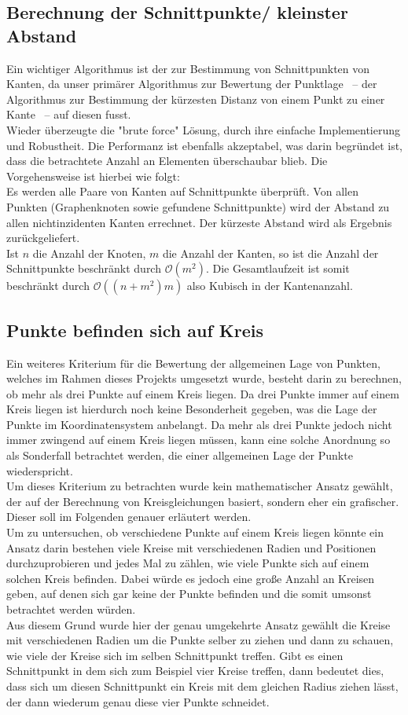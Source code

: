\documentclass[a4paper,twocolumn]{scrartcl}
\begin{document}
\subsection{Berechnung der Schnittpunkte/ kleinster Abstand}
Ein wichtiger Algorithmus ist der zur Bestimmung von Schnittpunkten von Kanten, da unser primärer Algorithmus zur Bewertung der Punktlage ~-- der Algorithmus zur Bestimmung der kürzesten Distanz von einem Punkt zu einer Kante ~-- auf diesen fusst. \\
Wieder \"uberzeugte die "brute force" L\"osung, durch ihre einfache Implementierung und Robustheit. Die Performanz ist ebenfalls akzeptabel, was darin begr\"undet ist, dass die betrachtete Anzahl an Elementen \"uberschaubar blieb.
Die Vorgehensweise  ist hierbei wie folgt:\\
Es werden alle Paare von Kanten auf Schnittpunkte \"uberpr\"uft. Von allen Punkten (Graphenknoten sowie  gefundene Schnittpunkte) wird der Abstand zu allen nichtinzidenten Kanten errechnet. Der k\"urzeste Abstand wird als Ergebnis zur\"uckgeliefert.\\
Ist $n$ die Anzahl der Knoten, $m$ die Anzahl der Kanten, so ist die Anzahl der Schnittpunkte beschr\"ankt durch $\mathcal{O}(m^2)$. Die Gesamtlaufzeit ist somit beschr\"ankt durch $\mathcal{O}((n+m^2)m)$ also Kubisch in der Kantenanzahl.
\subsection{Punkte befinden sich auf Kreis}
Ein weiteres Kriterium für die Bewertung der allgemeinen Lage von Punkten, welches im Rahmen dieses Projekts umgesetzt wurde, besteht darin zu berechnen, ob mehr als drei Punkte auf einem Kreis liegen. Da drei Punkte immer auf einem Kreis liegen ist hierdurch noch keine Besonderheit gegeben, was die Lage der Punkte im Koordinatensystem anbelangt. Da mehr als drei Punkte jedoch nicht immer zwingend auf einem Kreis liegen müssen, kann eine solche Anordnung so als Sonderfall betrachtet werden, die einer allgemeinen Lage der Punkte wiederspricht.\\
Um dieses Kriterium zu betrachten wurde kein mathematischer Ansatz gewählt, der auf der Berechnung von Kreisgleichungen basiert, sondern eher ein grafischer. Dieser soll im Folgenden genauer erläutert werden.\\
Um zu untersuchen, ob verschiedene Punkte auf einem Kreis liegen könnte ein Ansatz darin bestehen viele Kreise mit verschiedenen Radien und Positionen durchzuprobieren und jedes Mal zu zählen, wie viele Punkte sich auf einem solchen Kreis befinden. Dabei würde es jedoch eine große Anzahl an Kreisen geben, auf denen sich gar keine der Punkte befinden und die somit umsonst betrachtet werden würden.\\
Aus diesem Grund wurde hier der genau umgekehrte Ansatz gewählt die Kreise mit verschiedenen Radien um die Punkte selber zu ziehen und dann zu schauen, wie viele der Kreise sich im selben Schnittpunkt treffen. Gibt es einen Schnittpunkt in dem sich zum Beispiel vier Kreise treffen, dann bedeutet dies, dass sich um diesen Schnittpunkt ein Kreis mit dem gleichen Radius ziehen lässt, der dann wiederum genau diese vier Punkte schneidet.
 
\end{document}
